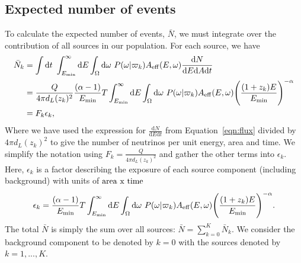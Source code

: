 \documentclass[fontsize=12pt]{article}
\begin{document}
\subsection{Expected number of events}
To calculate the expected number of events, $\bar{N}$, we must integrate over the contribution of all sources in our population. For each source, we have 
\begin{equation}
\begin{split}
\bar{N}_k &= \int \mathrm{d}t \ \int_{E_{\rm{min}}}^{\infty} \mathrm{d}E \int_\Omega \mathrm{d}\omega \ P(\omega | \varpi_k) A_\mathrm{eff}(E, \omega)\frac{\mathrm{d}N}{\mathrm{d}E\mathrm{d}A\mathrm{d}t} \\
&= \frac{Q}{4 \pi d_L(z_k)^2} \frac{(\alpha -1)}{E_\mathrm{min}} T \int_{E_{\rm{min}}}^{\infty} \mathrm{d}E \int_\Omega \mathrm{d}\omega \ P(\omega | \varpi_k) A_\mathrm{eff}(E, \omega) \Bigg( \frac{(1+z_k)E}{E_\mathrm{min}} \Bigg)^{-\alpha} \\
&= F_k \epsilon_k,
\end{split}
\end{equation}
Where we have used the expression for $\frac{\mathrm{d}N}{\mathrm{d}E\mathrm{d}t}$ from Equation~\ref{eqn:flux} divided by $4 \pi d_L(z_k)^2$ to give the number of neutrinos per unit energy, area and time. We simplify the notation using $F_k = \frac{Q}{4 \pi d_L(z_k)^2}$ and gather the other terms into $\epsilon_k$. Here, $\epsilon_k$ is a factor describing the exposure of each source component (including background) with units of $\rm{area} \ x \ \rm{time}$  
\begin{equation}
\epsilon_k = \frac{(\alpha -1)}{E_\mathrm{min}} T \int_{E_{\rm{min}}}^{\infty} \mathrm{d}E \int_\Omega \mathrm{d}\omega \ P(\omega | \varpi_k) A_\mathrm{eff}(E, \omega) \Bigg( \frac{(1+z_k)E}{E_\mathrm{min}} \Bigg)^{-\alpha}.
\end{equation}
The total $\bar{N}$ is simply the sum over all sources: $\bar{N} = \sum_{k=0}^K \bar{N}_k$. We consider the background component to be denoted by $k=0$ with the sources denoted by $k=1, ..., K$.
\end{document}
